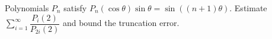 Polynomials $P_n$ satisfy $P_n(\cos\theta)\sin\theta=\sin((n+1)\theta)$. Estimate $\sum_{i=1}^{\infty}\dfrac{P_i(2)}{P_{2i}(2)}$ and bound the truncation error.
